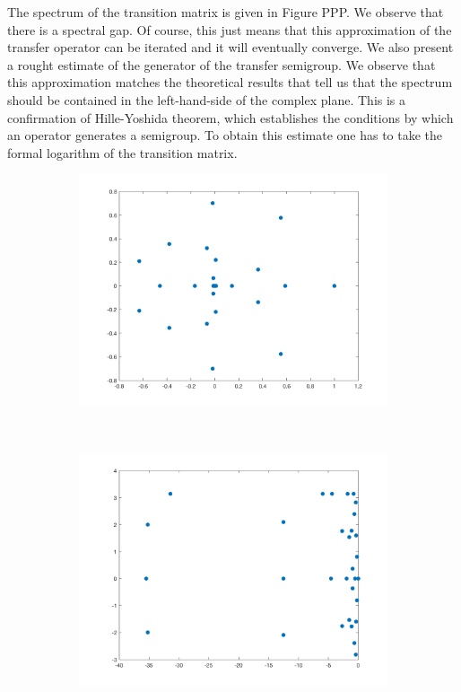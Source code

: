 The spectrum of the transition matrix is given in Figure PPP. We observe that there is a spectral gap. Of course, this just means that this approximation of the transfer operator can be iterated and it will eventually converge. We also present a rought estimate of the generator of the transfer semigroup. We observe that this approximation matches the theoretical results that tell us that the spectrum should be contained in the left-hand-side of the complex plane. This is a confirmation of Hille-Yoshida theorem, which establishes the conditions by which an operator generates a semigroup. To obtain this estimate one has to take the formal logarithm of the transition matrix.

\begin{figure}[H]
	\centering
	\begin{subfigure}[b]{0.4\textwidth}
		\includegraphics[width=\textwidth]{spectrumhenon.png}
		\label{henon0}
	\end{subfigure}
	~ %
	\begin{subfigure}[b]{0.4\textwidth}
		\includegraphics[width=\textwidth]{ruellepollicothenon.png}

\end{subfigure}
\end{figure}
